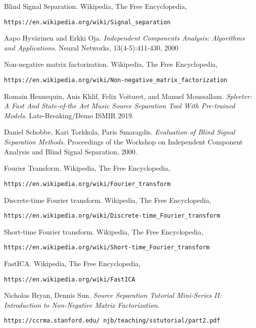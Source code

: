 \documentclass[a4paper,12pt]{article}
\begin{document}
\begin{thebibliography}{9}
Blind Signal Separation. Wikipedia, The Free Encyclopedia,
 
\texttt{https://en.wikipedia.org/wiki/Signal\_separation}

Aapo Hyvärinen and Erkki Oja. \textit{Independent Components Analysis: Algorithms and Applications}. Neural Networks, 13(4-5):411-430, 2000

Non-negative matrix factorization. Wikipedia, The Free Encyclopedia,

\texttt{https://en.wikipedia.org/wiki/Non-negative\_matrix\_factorization}

Romain Hennequin, Anis Khlif, Felix Voituret, and Manuel Moussallam. \textit{Spleeter: A Fast And State-of-the Art Music Source Separation Tool With Pre-trained Models}. Late-Breaking/Demo ISMIR 2019.

Daniel Schobbe, Kari Torkkola, Paris Smaragdis. \textit{Evaluation of Blind Signal Separation Methods}. Proceedings of the Workshop on Independent Component Analysis and Blind Signal Separation, 2000.

Fourier Transform. Wikipedia, The Free Encyclopedia,

\texttt{https://en.wikipedia.org/wiki/Fourier\_transform}

Discrete-time Fourier transform. Wikipedia, The Free Encyclopedia,

\texttt{https://en.wikipedia.org/wiki/Discrete-time\_Fourier\_transform}

Short-time Fourier transform. Wikipedia, The Free Encyclopedia,

\texttt{https://en.wikipedia.org/wiki/Short-time\_Fourier\_transform}

FastICA. Wikipedia, The Free Encyclopedia,

\texttt{https://en.wikipedia.org/wiki/FastICA}

Nicholas Bryan, Dennis Sun. \textit{Source Separation Tutorial Mini-Series II: Introduction to Non-Negative Matrix Factorization}.

\texttt{https://ccrma.stanford.edu/~njb/teaching/sstutorial/part2.pdf}

\end{thebibliography}
\end{document}
